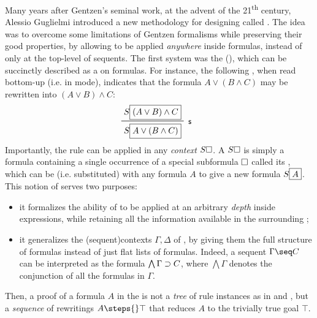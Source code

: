 \AP
Many years after Gentzen's seminal work, at the advent of the
21\textsuperscript{th} century, Alessio Guglielmi introduced a new methodology
for designing  called 
. The idea was to overcome some limitations of
Gentzen formalisms while preserving their good properties, by allowing
 to be applied \emph{anywhere} inside formulas, instead of
only at the top-level of sequents. The
first  system was the 
(), which can be succinctly described as a 
on formulas. For instance, the following , when read
bottom-up (i.e. in  mode), indicates that the formula $A \lor (B
\land C)$ may be rewritten into $(A \lor B) \land C$:
$$\R[\rsf{s}]{S\select{(A \lor B) \land C}}{S\select{A \lor (B \land C)}}$$
\AP Importantly, the rule can be applied in any \emph{context} $S\square$. A
 $S\square$ is simply a formula containing a single occurrence of a
special subformula $\square$ called its , which can be 
(i.e. substituted) with any formula $A$ to give a new formula $S\fbox{$A$}$.
This notion of  serves two purposes:
\begin{itemize}
  \item it formalizes the ability of  to be applied at an
  arbitrary \emph{depth} inside expressions, while retaining all the information
  available in the surrounding ;
  \item it generalizes the \kl(sequent){contexts} $\Gamma, \Delta$ of
  , by giving them the full structure of formulas instead
  of just flat lists of formulas. Indeed, a sequent $\Gamma \seq C$ can be
  interpreted as the formula $\bigwedge \Gamma \supset C$, where $\bigwedge
  \Gamma$ denotes the conjunction of all the formulas in $\Gamma$.
\end{itemize}
Then, a proof of a formula $A$ in the  is not a
\emph{tree} of rule instances as in  and , but a \emph{sequence} of rewritings $A \steps{} \top$ that reduces
$A$ to the trivially true goal $\top$.

